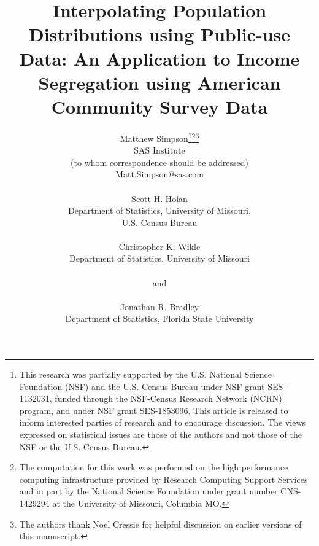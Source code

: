 \documentclass[12pt]{article}
\renewcommand{\baselinestretch}{1.5}
\begin{document}
\def\spacingset#1{\renewcommand{\baselinestretch}%
{#1}\small\normalsize} \spacingset{1}


\vskip 2mm

{
  \title{\bf Interpolating Population Distributions using Public-use Data: An Application to Income Segregation using American Community Survey Data}
  \author{Matthew Simpson\thanks{This research was partially supported by the U.S. National Science Foundation (NSF) and the U.S. Census Bureau under NSF grant SES-1132031, funded through the NSF-Census Research Network (NCRN) program, and under NSF grant SES-1853096. This article is released to inform interested parties of research and to encourage discussion.  The views expressed on statistical issues are those of the authors and not those of the NSF or the U.S. Census Bureau.}\thanks{The computation for this work was performed on the high performance computing infrastructure provided by Research Computing Support Services and in part by the National Science Foundation under grant number CNS-1429294 at the University of Missouri, Columbia MO.}\thanks{The authors thank Noel Cressie for helpful discussion on earlier versions of this manuscript.}\hspace{.2cm}\\
    SAS Institute\\
    (to whom correspondence should be addressed)\\
    Matt.Simpson@sas.com\\\\
     Scott H. Holan\\
     Department of Statistics, University of Missouri,\\
     U.S. Census Bureau\\\\
     Christopher K. Wikle\\
       Department of Statistics, University of Missouri\\\\
       and\\\\
       Jonathan R. Bradley\\
       Department of Statistics, Florida State University}
     \maketitle
}
\end{document}
